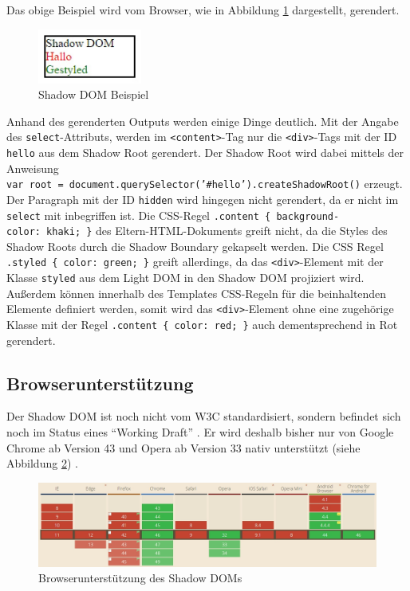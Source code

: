 Das obige Beispiel wird vom Browser, wie in Abbildung \ref{fig:shadowdombeispiel} dargestellt, gerendert.

\begin{figure}[htbp]
 \centering
 \includegraphics[width=3.4cm]{kapitel2/bilder/3-shadow-dom-beispiel}
 \caption{Shadow DOM Beispiel}
 \label{fig:shadowdombeispiel}
\end{figure}

Anhand des gerenderten Outputs werden einige Dinge deutlich. Mit der Angabe des \texttt{select}-Attributs, werden im \texttt{\textless{}content\textgreater{}}-Tag nur die \texttt{\textless{}div\textgreater{}}-Tags mit der ID \texttt{hello} aus dem Shadow Root gerendert. Der Shadow Root wird dabei mittels der Anweisung \texttt{var\ root\ =\ document.querySelector('\#hello').createShadowRoot()} erzeugt. Der Paragraph mit der ID \texttt{hidden} wird hingegen nicht gerendert, da er nicht im \texttt{select} mit inbegriffen ist. Die \ac{CSS}-Regel \texttt{.content\ \{\ background-color:\ khaki;\ \}} des Eltern-\ac{HTML}-Dokuments greift nicht, da die Styles des Shadow Roots durch die Shadow Boundary gekapselt werden. Die \ac{CSS} Regel \texttt{.styled\ \{\ color:\ green;\ \}} greift allerdings, da das \texttt{\textless{}div\textgreater{}}-Element mit der Klasse \texttt{styled} aus dem Light \ac{DOM} in den Shadow \ac{DOM} projiziert wird. Außerdem können innerhalb des Templates CSS-Regeln für die beinhaltenden Elemente definiert werden, somit wird das \texttt{\textless{}div\textgreater{}}-Element ohne eine zugehörige Klasse mit der Regel \texttt{.content\ \{\ color:\ red;\ \}} auch dementsprechend in Rot gerendert.


\subsection{Browserunterstützung}\label{shadow-dom-browserunterstuetzung}

Der Shadow \ac{DOM} ist noch nicht vom \ac{W3C} standardisiert, sondern befindet sich noch im Status eines ``Working Draft'' \cite{citeulike:13879687}. Er wird deshalb bisher nur von Google Chrome ab Version 43 und Opera ab Version 33 nativ unterstützt (siehe Abbildung \ref{fig:shadowdombrowser}) \cite{citeulike:13883407}.

\begin{figure}[htbp]
 \centering
 \includegraphics[width=\linewidth]{kapitel2/bilder/3-shadow-dom-browserunterstuetzung}
 \caption{Browserunterstützung des Shadow DOMs}
 \label{fig:shadowdombrowser}
\end{figure}
